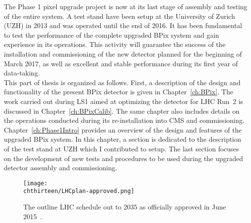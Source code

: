 The Phase 1 pixel upgrade project is now at its last stage of assembly and testing of the entire system.
A test stand have been setup at the University of Zurich (UZH) in 2013 and was operated until the end of 2016. It has been fundamental to test the performance of the complete upgraded BPix system and gain experience in its operations.
This activity will guarantee the success of the installation and commissioning of the new detector planned for the beginning of March 2017, as well as excellent and stable performance during its first year of data-taking.\\

This part of thesis is organized as follows.
First, a description of the design and functionality of the present BPix detector is given in Chapter~\ref{ch:BPix}.
The work carried out during LS1 aimed at optimizing the detector for LHC Run~2 is discussed in Chapter~\ref{ch:BPixCalib}.
The same chapter also includes details on the operations conducted during its re-installation into CMS and commissioning.
Chapter~\ref{ch:Phase1Intro} provides an overview of the design and features of the upgraded BPix system.
In this chapter, a section is dedicated to the description of the test stand at UZH which I contributed to setup.
The last section focuses on the development of new tests and procedures to be used during the upgraded detector assembly and commissioning.

\begin{figure}[!t]
 \begin{center}
 \texttt{[image: \\chthirteen/LHCplan-approved.png]}
 \end{center}
 \caption{The outline LHC schedule out to 2035 as officially approved in June 2015~\cite{LHCpage}.}
 \label{fig:LHCplan}
\end{figure}